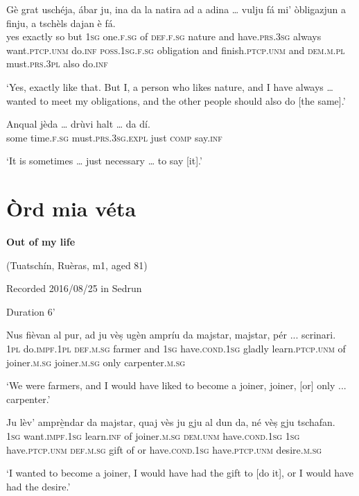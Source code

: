 \begin{linenumbers}
\gll Gè grat uschéja, ábar ju, ina da la natira ad a adina … vulju fá mi' òbligazjun a finju, a tschèls dajan è fá.   \\
yes exactly so but \textsc{1sg} one.\textsc{f.sg} of \textsc{def.f.sg} nature and have.\textsc{prs.3sg} always {} want.\textsc{ptcp.unm} do.\textsc{inf} \textsc{poss.1sg.f.sg} obligation and finish.\textsc{ptcp.unm} and \textsc{dem.m.pl} must.\textsc{prs.3pl} also do.\textsc{inf}\\
\end{linenumbers}
\medskip
\glt `Yes, exactly like that. But I, a person who likes nature, and I have always … wanted to meet my obligations, and the other people should also do [the same].'
\medskip

\begin{linenumbers}
\gll  Anqual jèda … drùvi halt … da dí.\\
some time.\textsc{f.sg} {} must.\textsc{prs.3sg.expl} just {} \textsc{comp} say.\textsc{inf}\\
\end{linenumbers}
\medskip
\glt `It is sometimes … just necessary … to say [it].'
\medskip

\section{Òrd mia véta}


\textbf{Out of my life}

\noindent
(Tuatschín, Ruèras, m1, aged 81)

\noindent
Recorded 2016/08/25 in Sedrun

Duration 6'
\bigskip


\begin{linenumbers}
\gll    Nus fièvan al pur, ad ju vèṣ ugèn ampríu da majstar, majstar, pér ... scrinari.\\
 \textsc{1pl} do.\textsc{impf.1pl} \textsc{def.m.sg} farmer and \textsc{1sg} have.\textsc{cond.1sg} gladly learn.\textsc{ptcp.unm} of joiner.\textsc{m.sg} joiner.\textsc{m.sg} only {} carpenter.\textsc{m.sg}\\
\end{linenumbers}
\medskip
\glt `We were farmers, and I would have liked to become a joiner, joiner, [or] only ... carpenter.'
\medskip

\begin{linenumbers}
\gll    Ju lèv’ amprè̱ndar da majstar, quaj vès ju gju al dun da, né vèṣ gju tschafan.\\
 \textsc{1sg} want.\textsc{impf.1sg} learn.\textsc{inf} of joiner.\textsc{m.sg} \textsc{dem.unm} have.\textsc{cond.1sg} \textsc{1sg} have.\textsc{ptcp.unm} \textsc{def.m.sg} gift of or have.\textsc{cond.1sg} have.\textsc{ptcp.unm} desire.\textsc{m.sg}\\
\end{linenumbers}
\medskip
\glt `I wanted to become a joiner, I would have had the gift to [do it], or I would have had the desire.'
\medskip

